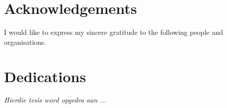 \begin{abstract}[english]%
meep
\end{abstract}


\begin{abstract}[afrikaans]%
meep
\end{abstract}


\chapter{Acknowledgements}%

I would like to express my sincere gratitude to the following people
and organisations.


\chapter{Dedications}%
 \vfill
 \begin{Afr}
 \begin{center}\itshape
    Hierdie tesis word opgedra aan ...
 \end{center}
 \end{Afr}
 \vfill
 \clearpage

\endinput
